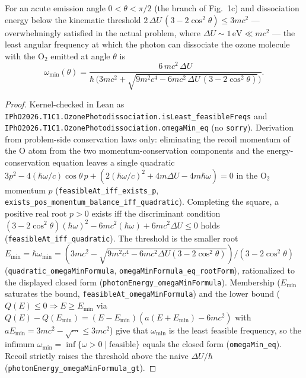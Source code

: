 \begin{theorem}
\label{thm:physics:ipho_2026_t1_c1:target}
\leanok
For an acute emission angle $0 < \theta < \pi/2$ (the branch of Fig.~1c) and
dissociation energy below the kinematic threshold
$2\,\Delta U\,(3 - 2\cos^2\theta) \le 3 m c^{2}$ — overwhelmingly satisfied in
the actual problem, where $\Delta U \sim 1\,\mathrm{eV} \ll mc^{2}$ — the least
angular frequency at which the photon can dissociate the ozone molecule with
the $\mathrm{O}_2$ emitted at angle $\theta$ is
\[
\omega_{\min}(\theta)
= \frac{6\,m c^{2}\,\Delta U}
{\hbar\,\bigl(3 m c^{2} + \sqrt{9 m^{2} c^{4} - 6 m c^{2}\,\Delta U\,(3 - 2\cos^{2}\theta)}\bigr)} .
\]
\end{theorem}
\begin{proof}
\leanok
Kernel-checked in Lean as
\texttt{IPhO2026.T1C1.OzonePhotodissociation.isLeast\_feasibleFreqs} and
\texttt{IPhO2026.T1C1.OzonePhotodissociation.omegaMin\_eq} (no \texttt{sorry}).
Derivation from problem-side conservation laws only: eliminating the recoil
momentum of the O atom from the two momentum-conservation components and the
energy-conservation equation leaves a single quadratic
$3p^{2} - 4(\hbar\omega/c)\cos\theta\,p + (2(\hbar\omega/c)^{2} + 4m\Delta U - 4m\hbar\omega) = 0$
in the $\mathrm{O}_2$ momentum $p$ (\texttt{feasibleAt\_iff\_exists\_p},
\texttt{exists\_pos\_momentum\_balance\_iff\_quadratic}).  Completing the square,
a positive real root $p > 0$ exists iff the discriminant condition
$(3 - 2\cos^{2}\theta)(\hbar\omega)^{2} - 6mc^{2}(\hbar\omega) + 6mc^{2}\Delta U \le 0$
holds (\texttt{feasibleAt\_iff\_quadratic}).  The threshold is the smaller root
$E_{\min} = \hbar\omega_{\min} = (3mc^{2} - \sqrt{9m^{2}c^{4} - 6mc^{2}\Delta U(3-2\cos^{2}\theta)})/(3-2\cos^{2}\theta)$
(\texttt{quadratic\_omegaMinFormula}, \texttt{omegaMinFormula\_eq\_rootForm}),
rationalized to the displayed closed form (\texttt{photonEnergy\_omegaMinFormula}).
Membership ($E_{\min}$ saturates the bound, \texttt{feasibleAt\_omegaMinFormula})
and the lower bound ($Q(E) \le 0 \Rightarrow E \ge E_{\min}$ via
$Q(E) - Q(E_{\min}) = (E - E_{\min})(a(E + E_{\min}) - 6mc^{2})$ with
$aE_{\min} = 3mc^{2} - \sqrt{\cdots} \le 3mc^{2}$) give that $\omega_{\min}$ is
the least feasible frequency, so the infimum $\omega_{\min} = \inf\{\omega > 0
\mid \text{feasible}\}$ equals the closed form (\texttt{omegaMin\_eq}).
Recoil strictly raises the threshold above the naive $\Delta U/\hbar$
(\texttt{photonEnergy\_omegaMinFormula\_gt}).
\end{proof}
